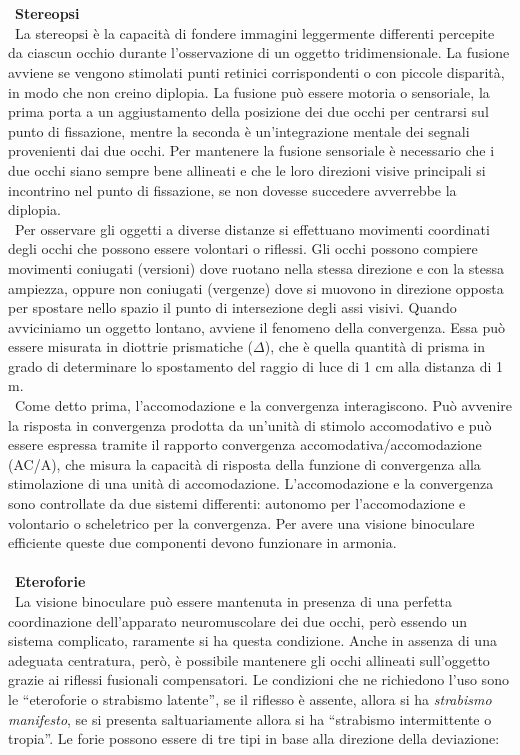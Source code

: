 \\\ \\\
\textbf{Stereopsi}
\\\
La stereopsi è la capacità di fondere immagini leggermente differenti percepite da ciascun occhio durante l’osservazione di un oggetto tridimensionale. La fusione avviene se vengono stimolati punti retinici corrispondenti o con piccole disparità, in modo che non creino diplopia. La fusione può essere motoria o sensoriale, la prima porta a un aggiustamento della posizione dei due occhi per centrarsi sul punto di fissazione, mentre la seconda è un’integrazione mentale dei segnali provenienti dai due occhi. Per mantenere la fusione sensoriale è necessario che i due occhi siano sempre bene allineati e che le loro direzioni visive principali si incontrino nel punto di fissazione, se non dovesse succedere avverrebbe la diplopia.
\\\
Per osservare gli oggetti a diverse distanze si effettuano movimenti coordinati degli occhi che possono essere volontari o riflessi. Gli occhi possono compiere movimenti coniugati (versioni) dove ruotano nella stessa direzione e con la stessa ampiezza, oppure non coniugati (vergenze) dove si muovono in direzione opposta per spostare nello spazio il punto di intersezione degli assi visivi. Quando avviciniamo un oggetto lontano, avviene il fenomeno della convergenza. Essa può essere misurata in diottrie prismatiche ($\Delta$), che è quella quantità di prisma in grado di determinare lo spostamento del raggio di luce di 1 cm alla distanza di 1 m. 
\\\
Come detto prima, l’accomodazione e la convergenza interagiscono. Può avvenire la risposta in convergenza prodotta da un’unità di stimolo accomodativo e può essere espressa tramite il rapporto convergenza accomodativa/accomodazione (AC/A), che misura la capacità di risposta della funzione di convergenza alla stimolazione di una unità di accomodazione. L’accomodazione e la convergenza sono controllate da due sistemi differenti: autonomo per l’accomodazione e volontario o scheletrico per la convergenza. Per avere una visione binoculare efficiente queste due componenti devono funzionare in armonia\cite{bib18}.
\\\ \\\
\textbf{Eteroforie}
\\\
La visione binoculare può essere mantenuta in presenza di una perfetta coordinazione dell’apparato neuromuscolare dei due occhi, però essendo un sistema complicato, raramente si ha questa condizione. Anche in assenza di una adeguata centratura, però, è possibile mantenere gli occhi allineati sull’oggetto grazie ai riflessi fusionali compensatori. Le condizioni che ne richiedono l’uso sono le “eteroforie o strabismo latente”, se il riflesso è assente, allora si ha \emph{strabismo manifesto}, se si presenta saltuariamente allora si ha “strabismo intermittente o tropia”. Le forie possono essere di tre tipi in base alla direzione della deviazione:
